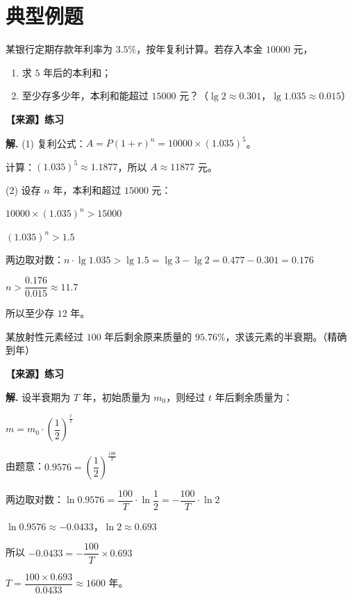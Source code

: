 \documentclass[11pt]{ctexrep}
\begin{document}
\section*{典型例题}

\begin{example}[复利计算]
    某银行定期存款年利率为 $3.5\%$，按年复利计算。若存入本金 $10000$ 元，
    \begin{enumerate}
        \item 求 $5$ 年后的本利和；
        \item 至少存多少年，本利和能超过 $15000$ 元？（$\lg 2 \approx 0.301$，$\lg 1.035 \approx 0.015$）
    \end{enumerate}
    
    \textbf{【来源】练习}
\end{example}

\textbf{解.} (1) 复利公式：$A = P(1+r)^n = 10000 \times (1.035)^5$。

计算：$(1.035)^5 \approx 1.1877$，所以 $A \approx 11877$ 元。

(2) 设存 $n$ 年，本利和超过 $15000$ 元：

$10000 \times (1.035)^n > 15000$

$(1.035)^n > 1.5$

两边取对数：$n \cdot \lg 1.035 > \lg 1.5 = \lg 3 - \lg 2 = 0.477 - 0.301 = 0.176$

$n > \dfrac{0.176}{0.015} \approx 11.7$

所以至少存 $12$ 年。

\begin{example}[半衰期问题]
    某放射性元素经过 $100$ 年后剩余原来质量的 $95.76\%$，求该元素的半衰期。（精确到年）
    
    \textbf{【来源】练习}
\end{example}

\textbf{解.} 设半衰期为 $T$ 年，初始质量为 $m_0$，则经过 $t$ 年后剩余质量为：

$m = m_0 \cdot \left(\dfrac{1}{2}\right)^{\frac{t}{T}}$

由题意：$0.9576 = \left(\dfrac{1}{2}\right)^{\frac{100}{T}}$

两边取对数：$\ln 0.9576 = \dfrac{100}{T} \cdot \ln \dfrac{1}{2} = -\dfrac{100}{T} \cdot \ln 2$

$\ln 0.9576 \approx -0.0433$，$\ln 2 \approx 0.693$

所以 $-0.0433 = -\dfrac{100}{T} \times 0.693$

$T = \dfrac{100 \times 0.693}{0.0433} \approx 1600$ 年。
\end{document}
